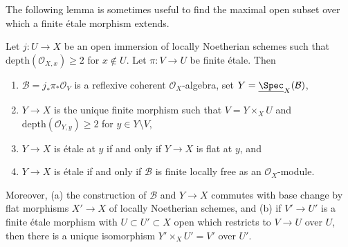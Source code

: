 \noindent
The following lemma is sometimes useful to find the maximal
open subset over which a finite \'etale morphism extends.

\begin{lemma}
\label{lemma-extend-S2}
Let $j : U \to X$ be an open immersion of locally Noetherian schemes
such that $\text{depth}(\mathcal{O}_{X, x}) \geq 2$ for $x \not \in U$.
Let $\pi : V \to U$ be finite \'etale. Then
\begin{enumerate}
\item $\mathcal{B} = j_*\pi_*\mathcal{O}_V$ is a reflexive coherent
$\mathcal{O}_X$-algebra, set $Y = \underline{\Spec}_X(\mathcal{B})$,
\item $Y \to X$ is the unique finite morphism such that
$V = Y \times_X U$ and $\text{depth}(\mathcal{O}_{Y, y}) \geq 2$
for $y \in Y \setminus V$,
\item $Y \to X$ is \'etale at $y$ if and only if $Y \to X$ is flat at $y$, and
\item $Y \to X$ is \'etale if and only if $\mathcal{B}$
is finite locally free as an $\mathcal{O}_X$-module.
\end{enumerate}
Moreover, (a) the construction of $\mathcal{B}$ and $Y \to X$ commutes
with base change by flat morphisms $X' \to X$ of locally Noetherian
schemes, and (b) if $V' \to U'$ is a finite \'etale morphism with
$U \subset U' \subset X$ open which restricts to $V \to U$ over $U$,
then there is a unique isomorphism $Y' \times_X U' = V'$ over $U'$.
\end{lemma}

